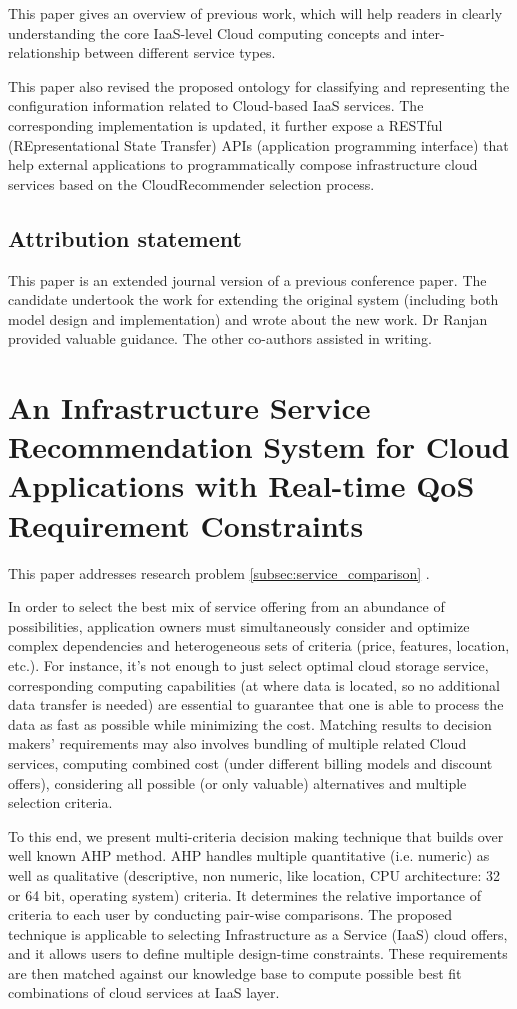 This paper gives an overview of previous work, which will help readers in clearly understanding the core IaaS-level Cloud computing concepts and inter-relationship between different service types.

This paper also revised the proposed ontology for classifying and representing the configuration information related to Cloud-based IaaS services. The corresponding  implementation is updated, it further expose a RESTful (REpresentational State Transfer) APIs (application programming interface) that help external applications to programmatically compose infrastructure cloud services based on the CloudRecommender selection process.

\subsection{Attribution statement}
This paper is an extended journal version of a previous conference paper.
The candidate undertook the work for extending the original system 
(including both model design and implementation) and wrote about the new work.
Dr Ranjan provided valuable guidance.
The other co-authors assisted in writing.

\section{An Infrastructure Service Recommendation System for Cloud Applications with Real-time QoS Requirement Constraints}
This paper addresses research problem \ref{subsec:service_comparison} . 

In order to select the best mix of service offering from an abundance of possibilities, application owners must simultaneously consider and optimize complex dependencies and heterogeneous sets of criteria (price, features, location, etc.). 
For instance, it's not enough to just select optimal cloud storage service, corresponding computing capabilities (at where data is located, so no additional data transfer is needed) are essential to guarantee that one is able to process the data as fast as possible while minimizing the cost. 
Matching results to decision makers’ requirements may also involves bundling of multiple related Cloud services, computing combined cost (under different billing models and discount offers), considering all possible (or only valuable) alternatives and multiple selection criteria.

To this end, we present multi-criteria decision making technique that builds over well known AHP method. AHP handles multiple quantitative (i.e. numeric) as well as qualitative (descriptive, non numeric, like location, CPU architecture: 32 or 64 bit, operating system) criteria. It determines the relative importance of criteria to each user by conducting pair-wise comparisons. The proposed technique is applicable to selecting Infrastructure as a Service (IaaS) cloud offers, and it allows users to define multiple design-time constraints. These requirements are then matched against our knowledge base to compute possible best fit combinations of cloud services at IaaS layer. 


